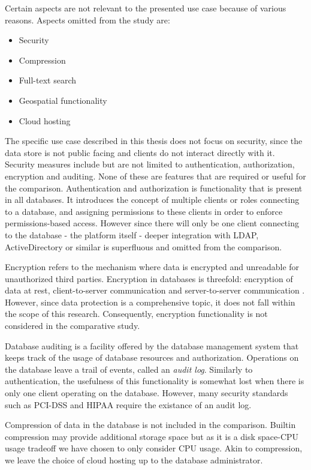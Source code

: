 Certain aspects are not relevant to the presented use case because of various reasons.
Aspects omitted from the study are:

\begin{itemize}
  \item Security
  \item Compression
  \item Full-text search
  \item Geospatial functionality
  \item Cloud hosting
\end{itemize}

The specific use case described in this thesis does not focus on security, since the data store is not public facing and clients do not interact directly with it.
Security measures include but are not limited to authentication, authorization, encryption and auditing.
None of these are features that are required or useful for the comparison.
Authentication and authorization is functionality that is present in all databases.
It introduces the concept of multiple clients or roles connecting to a database, and assigning permissions to these clients in order to enforce permissions-based access.
However since there will only be one client connecting to the database - the platform itself - deeper integration with LDAP, ActiveDirectory or similar is superfluous and omitted from the comparison.

Encryption refers to the mechanism where data is encrypted and unreadable for unauthorized third parties.
Encryption in databases is threefold: encryption of data at rest, client-to-server communication and server-to-server communication \autocite{Grolinger2013}.
However, since data protection is a comprehensive topic, it does not fall within the scope of this research.
Consequently, encryption functionality is not considered in the comparative study.

Database auditing is a facility offered by the database management system that keeps track of the usage of database resources and authorization.
Operations on the database leave a trail of events, called an \textit{audit log}.
Similarly to authentication, the usefulness of this functionality is somewhat lost when there is only one client operating on the database.
However, many security standards such as PCI-DSS and HIPAA require the existance of an audit log.

Compression of data in the database is not included in the comparison.
Builtin compression may provide additional storage space but as it is a disk space-CPU usage tradeoff we have chosen to only consider CPU usage.
Akin to compression, we leave the choice of cloud hosting up to the database administrator.

